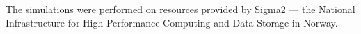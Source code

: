 \documentclass[draft]{agujournal2019}
\begin{document}
The simulations were performed on resources provided by Sigma2 --- the National
Infrastructure for High Performance Computing and Data Storage in Norway.

%
%



%
%
%
%
%
\end{document}
